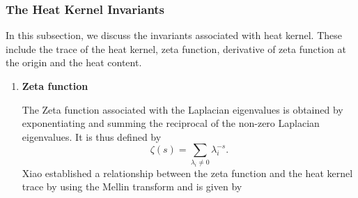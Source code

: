 \documentclass[10pt,a4paper]{article}
\begin{document}
        \subsubsection{The Heat Kernel Invariants}
        In this subsection, we discuss the invariants associated with heat kernel. These include the trace of the heat kernel, zeta function, derivative of zeta function at the origin and the heat content.
        \begin{enumerate}[1]
            \item \textbf{Zeta function}
            
            The Zeta function associated with the Laplacian eigenvalues is obtained by exponentiating and summing the reciprocal of the non-zero Laplacian eigenvalues. It is thus defined by
            \begin{equation}
            \zeta(s) = \sum_{\lambda_i \neq 0} \lambda_i ^{-s}.
            \end{equation} 
            Xiao \citep{xiao2009graph} established a relationship between the zeta function and the heat kernel trace by using the Mellin transform and is given by 
            

\end{enumerate}
\end{document}
